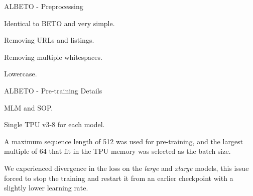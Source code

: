 \documentclass[aspectratio=169,xcolor=dvipsnames]{beamer}
\newenvironment{wideitemize}{\itemize\addtolength{\itemsep}{10pt}}{\enditemize}
\begin{document}
\begin{frame}{ALBETO - Preprocessing}

\begin{wideitemize}
    \item Identical to BETO \citep{CaneteCFP2020} and very simple.
    \item Removing URLs and listings.
    \item Removing multiple whitespaces.
    \item Lowercase.
\end{wideitemize}

\end{frame}
\begin{frame}{ALBETO - Pre-training Details}

\begin{wideitemize}
    \item MLM and SOP.
    \item Single TPU v3-8 for each model.
    \item A maximum sequence length of 512 was used for pre-training, and the largest multiple of 64 that fit in the TPU memory was selected as the batch size.
    \item We experienced divergence in the loss on the \textit{large} and \textit{xlarge} models, this issue forced to stop the training and restart it from an earlier checkpoint with a slightly lower learning rate.
\end{wideitemize}

\begin{table}
\begin{center}
\end{center}
\caption{Training details of all ALBETO models, which were trained using a single TPU v3-8 each one. }
\label{table:training-details-albetos}
\end{table}

\end{frame}
\end{document}
